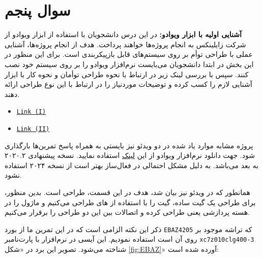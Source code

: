 \section{سوال پنجم}
\textbf{آشنایی اولیه با ابزار ویوادو:} در این درس دانشجویان با استفاده از ابزار ویوادو از شرکت زایلینکس به انجام پروژه‌ها خواهند پرداخت. هدف از انجام پروژه‌ها، آشنایی عملی با طراحی توأم بر روی سیستم‌های قابل بازپیکربندی است. برای این منظور در این بخش در ابتدا دانشجویان می‌بایست نرم‌افزار ویوادو را بر روی سیستم خود نصب کنند. سپس با بررسی لینک زیر در ارتباط با نحوه طراحی توأمان و نحوه کار با ابزار آشنایی لازم را کسب کرده و توضیحات موردنیاز را در ارتباط با این نوع طراحی ارائه دهند.

\begin{latin}
	\begin{itemize}
		\item 
		\texttt{\textcolor{magenta}{\href{https://www.youtube.com/watch?v=_odNhKOZjEo}{Link (I)}}}
		
		\item 
		\texttt{\textcolor{magenta}{\href{https://www.youtube.com/watch?v=AOy5l36DroY&t=0s}{Link (II)}}}
	\end{itemize}
\end{latin}

پروژه مشابه موارد یاد شده در دو ویدئو نیز بایستی به همراه پاسخ تمرین‌ها بارگذاری شود. جهت دانلود نرم‌افزار ویوادو از این 
\href{https://downloadly.ir/software/engineering-specialized/xilinx-vivado-design-suite/}{لینک}
استفاده نمایید. نسخه پیشنهادی ۲۰۲۰.۲ به بعد می‌باشد. به دلیل مشکل احتمالی در فعال‌ساز بهتر است از نسخه ۲۰۲۴ استفاده نشود. \newline \newline





همانطور که در ویدئو نیز بیان شد، هدف در این قسمت، طراحی  است. بدین منظور، برای طراحی یک گیت  ساده، گیت  را با استفاده از  های  طراحی می‌کنیم و ماژول  را در هسته پردازشی یعنی  طراحی کرده و اتصالات بین این دو طراحی را برقرار می‌کنیم.


ذکر این نکته الزامی است که در این تمرین ما از بورد \texttt{EBAZ4205} که تراشه موجود بر روی آن \texttt{} است استفاده نمودیم. این آیسی در نرم‌افزار  با پارت‌نامبر \texttt{xc7z010clg400-3} شناخته می‌شود. تصویر این برد در «شکل \ref{fig:EBAZ}» آورده شده است:



